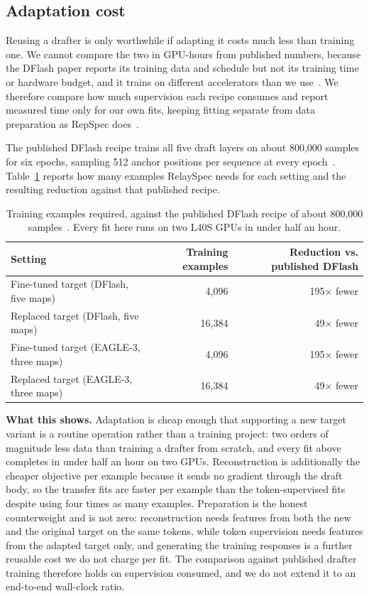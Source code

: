 \subsection{Adaptation cost}
\label{sec:adaptation-cost}
Reusing a drafter is only worthwhile if adapting it costs much less than training one. We cannot compare the two in GPU-hours from published numbers, because the DFlash paper reports its training data and schedule but not its training time or hardware budget, and it trains on different accelerators than we use~\citep{chen2026dflash}. We therefore compare how much supervision each recipe consumes and report measured time only for our own fits, keeping fitting separate from data preparation as RepSpec does~\citep{huo2026repspec}.

The published DFlash recipe trains all five draft layers on about 800{,}000 samples for six epochs, sampling 512 anchor positions per sequence at every epoch~\citep{chen2026dflash}. Table~\ref{tab:cost} reports how many examples RelaySpec needs for each setting and the resulting reduction against that published recipe.

\begin{table}[t]
\centering
\caption{Training examples required, against the published DFlash recipe of about 800{,}000 samples~\citep{chen2026dflash}. Every fit here runs on two L40S GPUs in under half an hour.}
\label{tab:cost}
\small
\begin{tabular}{lrr}
\toprule
Setting & Training examples & Reduction vs. published DFlash \\
\midrule
Fine-tuned target (DFlash, five maps) & 4{,}096 & 195$\times$ fewer \\
Replaced target (DFlash, five maps) & 16{,}384 & 49$\times$ fewer \\
Fine-tuned target (EAGLE-3, three maps) & 4{,}096 & 195$\times$ fewer \\
Replaced target (EAGLE-3, three maps) & 16{,}384 & 49$\times$ fewer \\
\bottomrule
\end{tabular}
\end{table}

\textbf{What this shows.} Adaptation is cheap enough that supporting a new target variant is a routine operation rather than a training project: two orders of magnitude less data than training a drafter from scratch, and every fit above completes in under half an hour on two GPUs. Reconstruction is additionally the cheaper objective per example because it sends no gradient through the draft body, so the transfer fits are faster per example than the token-supervised fits despite using four times as many examples. Preparation is the honest counterweight and is not zero: reconstruction needs features from both the new and the original target on the same tokens, while token supervision needs features from the adapted target only, and generating the training responses is a further reusable cost we do not charge per fit. The comparison against published drafter training therefore holds on supervision consumed, and we do not extend it to an end-to-end wall-clock ratio.
